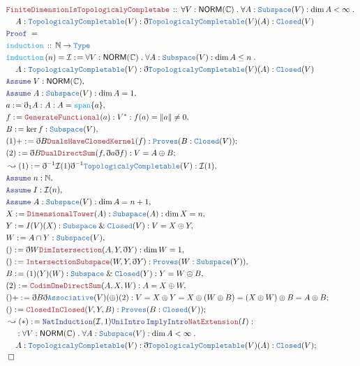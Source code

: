 \documentclass[12pt]{scrartcl}
\newcommand{\TYPE}[1]{\textcolor{NavyBlue}{\mathtt{#1}}}
\newcommand{\FUNC}[1]{\textcolor{Cerulean}{\mathtt{#1}}}
\newcommand{\LOGIC}[1]{\textcolor{Blue}{\mathtt{#1}}}
\newcommand{\THM}[1]{\textcolor{Maroon}{\mathtt{#1}}}
\renewcommand{\.}{\; . \;}
\newcommand{\de}{: \kern 0.1pc =}
\newcommand{\Act}[1]{\left( #1 \right)}
\newcommand{\Theorem}[2]{& \THM{#1} \, :: \, #2 \\ & \Proof = \\ }
\newcommand{\DeclareFunc}[2]{& \FUNC{#1} \, :: \, #2 \\}
\newcommand{\DefineNamedFunc}[4]{&  \FUNC{#1}\Act{#2} = #3 \de #4 \\}
\newcommand{\NewLine}{\\ & \kern 1pc}
\newcommand{\Page}[1]{\begin{align*} #1 \end{align*} \newpage   }
\newcommand{ \bd }{ \ByDef }
\renewcommand{\And}{\; \& \;}
\newcommand{\Nat}{\mathbb{N} }
\newcommand{\Say}[3]{& #1 \de #2 : #3, \\}
\newcommand{\Conclude}[3]{& #1 \de #2 : #3; \\}
\newcommand{\Derive}[3]{& \leadsto #1 \de #2 : #3, \\}
\newcommand{\DeriveConclude}[3]{& \leadsto #1 \de #2 : #3 ; \\}
\newcommand{\A}{\LOGIC{Assume} \;}
\newcommand{\Assume}[2]{& \A #1 : #2, \\}
\newcommand{\QED}{\; \square}
\newcommand{\EndProof}{& \QED \\}
\newcommand{\ByDef}{\eth}
\newcommand{\Proof}{\LOGIC{Proof} \; }
\newcommand{\NORM}{\mathsf{NORM}} %
\begin{document}
  \Page{
   \Theorem{FiniteDimensionIsTopologicalyCompletabe}
   {\forall V : \NORM(\mathbb{C}) \. 
     \forall A : \TYPE{Subspace}(V) : \dim A < \infty \. 
     \NewLine
      A : \TYPE{TopologicalyCompletable}(V) : \bd \TYPE{TopologicalyCompletable}(V)(A) : \TYPE{Closed}(V) }
\DeclareFunc{induction}{ \Nat \to \TYPE{Type}}
\DefineNamedFunc{induction}{n}{\mathcal{I}}{ 
     \forall V : \NORM(\mathbb{C}) \. \forall A : \TYPE{Subspace}(V) : \dim A \le n \. 
     \NewLine
       A : \TYPE{TopologicalyCompletable}(V) : \bd \TYPE{TopologicalyCompletable}(V)(A) : \TYPE{Closed}(V)    }
\Assume{V}{\NORM(\mathbb{C})}
\Assume{A}{ \TYPE{Subspace}(V) : \dim A = 1} 
\Say{a}{ \bd_1 A}{ A :  A = \FUNC{span}\{ a \} }
\Say{ f }{ \THM{GenerateFunctional}(a) }{V^* : f(a) = \| a \| \neq 0}
\Say{B}{ \ker f}{\TYPE{Subspace}(V)}
\Conclude{(1)+}{\bd B \THM{DualsHaveClosedKernel}(f)}{\TYPE{Proves}(B : \TYPE{Closed}(V))}
\Conclude{(2)}{ \bd B \THM{DualDirectSum}(f, \bd a\bd f) }{ V = A \oplus B}
\Derive{(1)}{ \bd^{-1}\mathcal{I}(1)\bd^{-1} \TYPE{TopologicalyCompletable}(V) }{\mathcal{I}(1)} 
\Assume{n}{\Nat}
\Assume{I}{\mathcal{I}(n)}
\Assume{A}{  \TYPE{Subspace}(V) : \dim A = n + 1  }
\Say{X}{\THM{DimensionalTower}(A)}{ \TYPE{Subspace}(A) : \dim X = n }
\Say{Y}{ I(V)(X)  }{ \TYPE{Subspace} \And \TYPE{Closed}(V) : V = X \oplus Y }
\Say{W}{ A \cap Y }{ \TYPE{Subspace}(V)  }
\Say{()}{ \bd W \THM{DimIntersection}(A, Y, \bd Y)  }{
  \dim W =  1 }
\Say{()}{ \THM{IntersectionSubspace}(W,Y,\bd Y) }{ \TYPE{Proves}(W : \TYPE{Subspace}(Y))  }
\Say{B}{ (1)(Y)(W)} {\TYPE{Subspace} \And \TYPE{Closed}(Y) : Y = W \oplus B }  
\Say{(2)}{\THM{CodimOneDirectSum}(A,X,W)}{A = X \oplus W}
\Conclude{() +}{
\bd B \bd \TYPE{Associative}(V)(\oplus) (2)}
{ V = X \oplus Y = X \oplus (W \oplus B) = (X \oplus  W) \oplus B = A \oplus B  }
\Conclude{()}{\THM{ClosedInClosed}(V,Y,B)}{\TYPE{Proves}(B : \TYPE{Closed}(V))}
\DeriveConclude{(*)}{ \LOGIC{NatInduction}(\mathcal{I}, 1)\LOGIC{UniIntro} \, \LOGIC{ImplyIntro}
  \THM{NatExtension}(I) }{  
   \NewLine :  
   \forall V : \NORM(\mathbb{C}) \. 
     \forall A : \TYPE{Subspace}(V) : \dim A < \infty \. 
     \NewLine
      A : \TYPE{TopologicalyCompletable}(V) : \bd \TYPE{TopologicalyCompletable}(V)(A) : \TYPE{Closed}(V)   
  }
\EndProof
}
\end{document}
